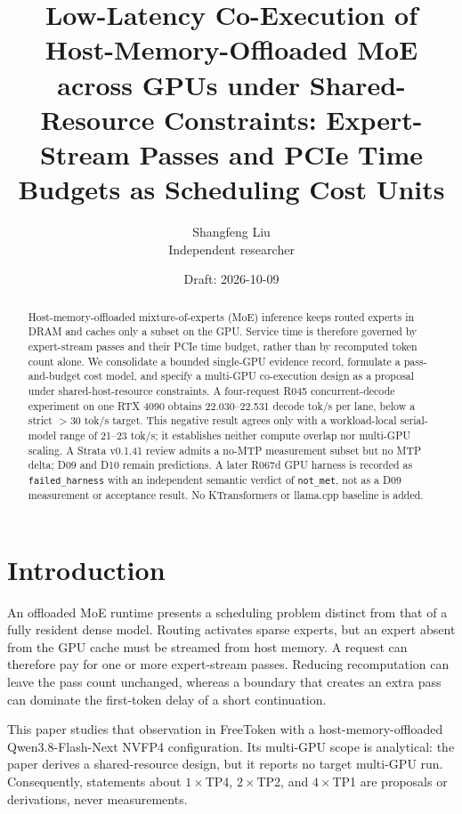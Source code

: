 \documentclass[11pt]{article}
\title{Low-Latency Co-Execution of Host-Memory-Offloaded MoE across GPUs under Shared-Resource Constraints: Expert-Stream Passes and PCIe Time Budgets as Scheduling Cost Units}
\author{Shangfeng Liu\\Independent researcher}
\date{Draft: 2026-10-09}
\begin{document}
\maketitle

\begin{abstract}
Host-memory-offloaded mixture-of-experts (MoE) inference keeps routed experts in DRAM and caches only a subset on the GPU. Service time is therefore governed by expert-stream passes and their PCIe time budget, rather than by recomputed token count alone. We consolidate a bounded single-GPU evidence record, formulate a pass-and-budget cost model, and specify a multi-GPU co-execution design as a proposal under shared-host-resource constraints. A four-request R045 concurrent-decode experiment on one RTX 4090 obtains 22.030--22.531 decode tok/s per lane, below a strict $>30$ tok/s target. This negative result agrees only with a workload-local serial-model range of 21--23 tok/s; it establishes neither compute overlap nor multi-GPU scaling. A Strata v0.1.41 review admits a no-MTP measurement subset but no MTP delta; D09 and D10 remain predictions. A later R067d GPU harness is recorded as \texttt{failed\_harness} with an independent semantic verdict of \texttt{not\_met}, not as a D09 measurement or acceptance result. No KTransformers or llama.cpp baseline is added.
\end{abstract}

\section{Introduction}

An offloaded MoE runtime presents a scheduling problem distinct from that of a fully resident dense model. Routing activates sparse experts, but an expert absent from the GPU cache must be streamed from host memory. A request can therefore pay for one or more expert-stream passes. Reducing recomputation can leave the pass count unchanged, whereas a boundary that creates an extra pass can dominate the first-token delay of a short continuation.

This paper studies that observation in FreeToken with a host-memory-offloaded Qwen3.8-Flash-Next NVFP4 configuration. Its multi-GPU scope is analytical: the paper derives a shared-resource design, but it reports no target multi-GPU run. Consequently, statements about $1\times$TP4, $2\times$TP2, and $4\times$TP1 are proposals or derivations, never measurements.
\end{document}
